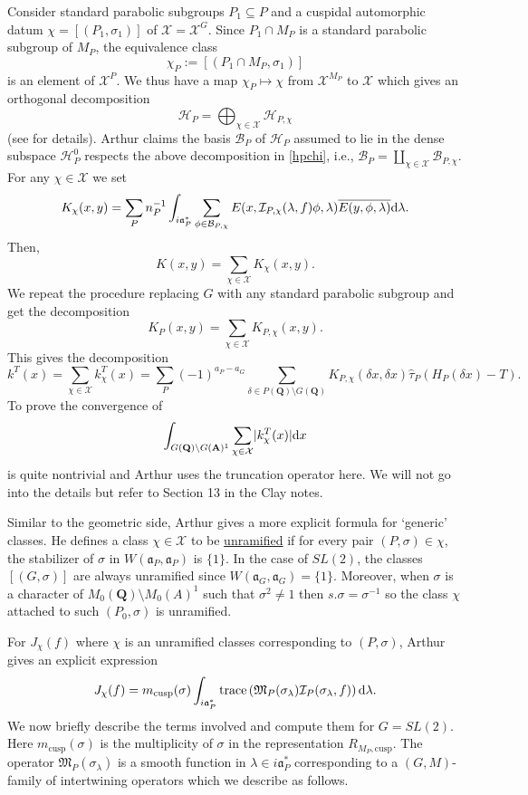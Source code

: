 \documentclass{ims9x6}
\def\apg{a_{P} - a_{G}}
\def\A{\mathbf A}
\def\Q{\mathbf Q}
\def\BBB{\mathcal B}
\def\HHH{\mathcal H}
\def\III{\mathcal I}
\def\MMM{\mathfrak M}	%
\def\XXX{\mathcal X}
\def\aaa{\mathfrak a}
\def\d{\text d}
\def\bs{\setminus}
\def\cusp{\text{cusp}}
\def\mod#1{\lvert #1 \rvert} %
\def\trace{\operatorname{trace}}
\begin{document}
Consider standard parabolic subgroups $P_1 \subseteq P$ and a cuspidal automorphic datum $\chi = [(P_1, \sigma_1)]$ of $\XXX = \XXX^G$. Since $P_1 \cap M_P$ is a standard parabolic subgroup of $M_P$, the equivalence class 
\[ \chi_P := [(P_1 \cap M_P, \sigma_1)] \]
is an element of $\XXX^P$. We thus have a map $\chi_P \mapsto \chi$ from $\XXX^{M_P}$ to $\XXX$ which gives an orthogonal decomposition
\[ \HHH_P = \bigoplus_{\chi \in \XXX} \HHH_{P, \chi} \]
(see \cite[\S 12]{clay} for details). 
Arthur claims the basis $\BBB_P$ of $\HHH_P$ assumed to lie in the dense subspace $\HHH_P^0$ respects the above decomposition in \cref{hpchi}, i.e., $\BBB_P = \coprod_{\chi \in \XXX} \BBB_{P, \chi}$. For any $\chi \in \XXX$ we set
\[ K_\chi(x, y) = \sum_P n_P^{-1} \int_{i\aaa_P^*} \sum_{\phi \in \BBB_{P, \chi}}
		E(x, \III_{P, \chi}(\lambda, f)\phi, \lambda) \overline{E(y, \phi, \lambda)} \d \lambda. \]
Then,
\[ K(x, y) = \sum_{\chi \in \XXX} K_\chi(x, y). \]
We repeat the procedure replacing $G$ with any standard parabolic subgroup and get the decomposition 
\[ K_P(x, y) = \sum_{\chi \in \XXX} K_{P, \chi}(x, y). \]
This gives the decomposition
\begin{equation*}
	k^T(x) = \sum_{\chi \in \XXX} k_\chi^T(x)  = \sum_P (-1)^{\apg} \sum_{\delta \in P(\Q)\bs G(\Q)} K_{P, \chi}(\delta x, \delta x) \hat\tau_P(H_P(\delta x) - T).
\end{equation*}
To prove the convergence of 
\[ \int_{G(\Q)\bs G(\A)^1} \sum_{\chi \in \XXX} \mod{k_\chi^T (x)} \d x \]
is quite nontrivial and Arthur uses the truncation operator here. We will not go into the details but refer to Section 13 in the Clay notes. 

Similar to the geometric side, Arthur gives a more explicit formula for `generic' classes. He defines a class $\chi \in \XXX$ to be \underline{unramified} if for every pair $(P, \sigma) \in \chi$, the stabilizer of $\sigma$ in $W(\aaa_P, \aaa_P)$ is $\{1\}$. In the case of $SL(2)$, the classes $[(G, \sigma)]$ are always unramified since $W(\aaa_G, \aaa_G) = \{1\}$. Moreover, when $\sigma$ is a character of $M_0(\Q)\bs M_0(A)^1$ such that $\sigma^2 \neq 1$ then $s.\sigma = \sigma^{-1}$ so the class $\chi$ attached to such $(P_0, \sigma)$ is unramified. 

For $J_\chi(f)$ where $\chi$ is an unramified classes corresponding to $(P, \sigma)$, Arthur gives an explicit expression
\[ J_\chi(f) = m_{\cusp}(\sigma) \int_{i\aaa_P^*} \trace\left(\MMM_P(\sigma_\lambda) \III_P(\sigma_\lambda, f)\right) \d \lambda. \]
We now briefly describe the terms involved and compute them for $G=SL(2)$. Here $m_{\cusp}(\sigma)$ is the multiplicity of $\sigma$ in the representation $R_{M_P, \cusp}$. The operator $\MMM_P(\sigma_\lambda)$ is a smooth function in $\lambda \in i\aaa_P^*$ corresponding to a $(G, M)$-family of intertwining operators which we describe as follows. 
\end{document}
